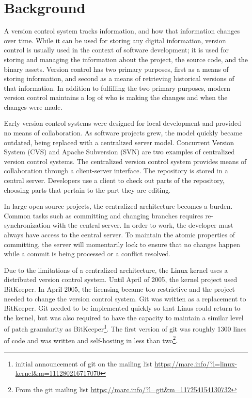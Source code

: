 \chapter{Background}\label{chap:background}

A version control system tracks information, and how that information
changes over time. While it can be used for storing any digital
information, version control is usually used in the context of software
development; it is used for storing and managing the information about
the project, the source code, and the binary assets. Version control has
two primary purposes, first as a means of storing information, and
second as a means of retrieving historical versions of that information.
In addition to fulfilling the two primary purposes, modern version
control maintains a log of who is making the changes and when the
changes were made.

Early version control systems were designed for local development and
provided no means of collaboration. As software projects grew, the model
quickly became outdated, being replaced with a centralized server model.
Concurrent Version System (CVS) and Apache Subversion (SVN) are two
examples of centralized version control systems. The centralized version
control system provides means of collaboration through a client-server
interface. The repository is stored in a central server. Developers use
a client to check out parts of the repository, choosing parts that
pertain to the part they are editing.

In large open source projects, the centralized architecture becomes a
burden. Common tasks such as committing and changing branches requires
re-synchronization with the central server. In order to work, the
developer must always have access to the central server. To maintain the
atomic properties of committing, the server will momentarily lock to
ensure that no changes happen while a commit is being processed or a
conflict resolved.


Due to the limitations of a centralized architecture, the Linux kernel
uses a distributed version control system. Until April of 2005, the
kernel project used BitKeeper. In April 2005, the licensing became too
restrictive and the project needed to change the version control system.
Git was written as a replacement to BitKeeper. Git needed to be
implemented quickly so that Linus could return to the kernel, but was
also required to have the capacity to maintain a similar level of patch
granularity as BitKeeper\footnote{initial announcement of git on the
  mailing list
  \url{https://marc.info/?l=linux-kernel&m=111280216717070}}. The first
version of git was roughly 1300 lines of code and was written and
self-hosting in less than two\footnote{From the git mailing list
  \url{https://marc.info/?l=git&m=117254154130732}}.

